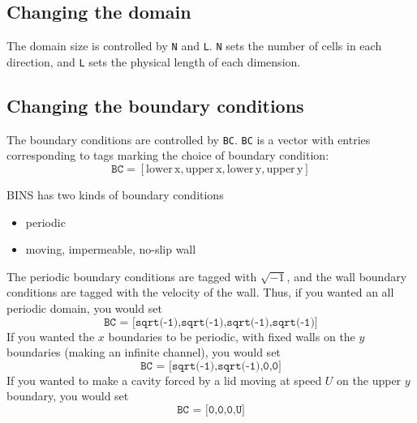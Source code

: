 \documentclass[12pt]{article}
\begin{document}
\subsection{Changing the domain}
The domain size is controlled by \texttt{N} and \texttt{L}.  \texttt{N} sets the number of cells in each direction, and \texttt{L} sets the physical length of each dimension.

\subsection{Changing the boundary conditions}
The boundary conditions are controlled by \texttt{BC}.  \texttt{BC} is a vector with entries corresponding to tags marking the choice of boundary condition:
\[ \texttt{BC} = [\mathrm{lower \hspace{2pt} x, upper\hspace{2pt} x, lower\hspace{2pt} y, upper\hspace{2pt} y} ]\]

BINS has two kinds of boundary conditions
\begin{itemize}
\item periodic
\item moving, impermeable, no-slip wall
\end{itemize}

The periodic boundary conditions are tagged with $\sqrt{-1}$, and the wall boundary conditions are tagged with the velocity of the wall.  Thus, if you wanted an all periodic domain, you would set
\[ \texttt{BC = [sqrt(-1),sqrt(-1),sqrt(-1),sqrt(-1)]}\]
If you wanted the $x$ boundaries to be periodic, with fixed walls on the $y$ boundaries (making an infinite channel), you would set
\[ \texttt{BC = [sqrt(-1),sqrt(-1),0,0]}\]
If you wanted to make a cavity forced by a lid moving at speed $U$ on the upper $y$ boundary, you would set
\[ \texttt{BC = [0,0,0,U]}\]
\end{document}
